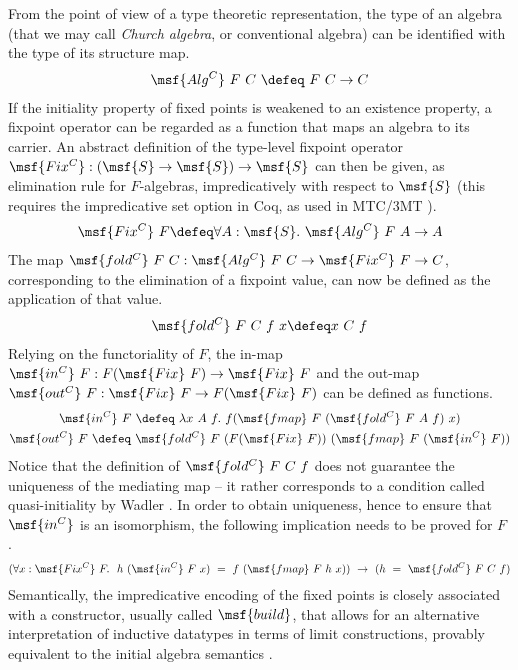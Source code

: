 \documentclass[submission,copyright,creativecommons]{eptcs}
\newcounter{prop}
\begin{document}
From the point of view of a type theoretic representation, the type of
an algebra (that we may call \emph{Church algebra}, or conventional
algebra) can be identified with the type of its structure map.
\begin{gather}
 \msf{Alg^C} \ F \ C \ \defeq \ F \ C \to C 
\end{gather}
If the initiality property of fixed points is weakened to an existence
property, a fixpoint operator can be regarded as a function that maps
an algebra to its carrier. An abstract definition of the type-level
fixpoint operator $\msf{Fix^C}: (\msf{S} \to \msf{S}) \to \msf{S}$ can
then be given, as elimination rule for $F$-algebras, impredicatively
with respect to $\msf{S}$ (this requires the impredicative set option
in Coq, as used in MTC/3MT \cite{Dela13}).
\begin{gather}
 \msf{Fix^C} \ F \defeq \forall A: \msf{S}. \ \msf{Alg^C} \ F \ A \to A
\end{gather}
The map $\msf{fold^C} \ F \ C : \msf{Alg^C} \ F \ C \to \msf{Fix^C}
\ F \to C$, corresponding to the elimination of a fixpoint value, can
now be defined as the application of that value.
\begin{gather}
\msf{fold^C} \ F \ C \ f \ x \defeq x \ C \ f
\end{gather}
Relying on the functoriality of $F$, the in-map $\msf{in^C} \ F : F
(\msf{Fix} \ F) \to \msf{Fix} \ F$ and the out-map $\msf{out^C} \ F :
\msf{Fix} \ F \to F (\msf{Fix} \ F)$ can be defined as functions.
\begin{gather}
\msf{in^C} \ F \ \defeq \ \lambda x \ A \ f. \ f (\msf{fmap} \ F
\ (\msf{fold^C} \ F \ A \ f) \ x) \\
\msf{out^C} \ F \ \defeq \ \msf{fold^C} \ F \ (F (\msf{Fix} \ F))
\ (\msf{fmap} \ F \ (\msf{in^C} \ F)) 
\end{gather}
Notice that the definition of $\msf{fold^C} \ F \ C \ f$ does not
guarantee the uniqueness of the mediating map -- it rather corresponds
to a condition called quasi-initiality by Wadler
\cite{WadlerRecTypes}. In order to obtain uniqueness, hence to ensure
that $\msf{in^C}$ is an isomorphism, the following implication needs
to be proved for $F$ \cite{Dela13,Keuchel13,Hutton99}.
\begin{gather} \label{church-alg-init1}
 (\forall x: \msf{Fix^C} \ F. \ \ h \ (\msf{in^C} \ F \ x) \ = \ f
\ (\msf{fmap} \ F \ h \ x)) \ \to \ (h \ = \ \msf{fold^C} \ F \ C
\ f) 
\end{gather}
Semantically, the impredicative encoding of the fixed points is
closely associated with a constructor, usually called $\msf{build}$,
that allows for an alternative interpretation of inductive datatypes
in terms of limit constructions, provably equivalent to the initial
algebra semantics \cite{GhaniUV04}.
\end{document}
